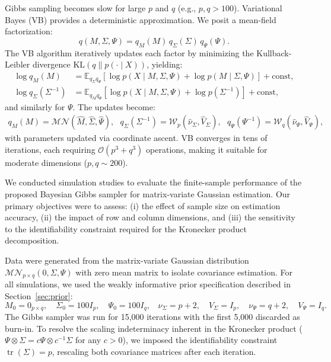 \documentclass[twoside]{article}
\begin{document}
\noindent Gibbs sampling becomes slow for large $p$ and $q$ (e.g., $p,q > 100$). Variational Bayes (VB) provides a deterministic approximation. We posit a mean-field factorization:
\begin{equation*}
q(M, \Sigma, \Psi) = q_M(M) \, q_\Sigma(\Sigma) \, q_\Psi(\Psi).
\end{equation*}
The VB algorithm iteratively updates each factor by minimizing the Kullback-Leibler divergence $\mathrm{KL}(q \| p(\cdot \mid X))$, yielding:
\begin{align*}
\log q_M(M) &= \mathbb{E}_{q_\Sigma q_\Psi}[\log p(X \mid M, \Sigma, \Psi) + \log p(M \mid \Sigma, \Psi)] + \text{const},\\
\log q_\Sigma(\Sigma^{-1}) &= \mathbb{E}_{q_M q_\Psi}[\log p(X \mid M, \Sigma, \Psi) + \log p(\Sigma^{-1})] + \text{const},
\end{align*}
and similarly for $\Psi$. The updates become:
\begin{eqnarray*}
q_M(M) = \mathcal{MN}(\widehat{M}, \widehat{\Sigma}, \widehat{\Psi}),\ \ \ 
q_\Sigma(\Sigma^{-1}) = \mathcal{W}_p(\widehat{\nu}_\Sigma, \widehat{V}_\Sigma),\ \ \ 
q_\Psi(\Psi^{-1}) = \mathcal{W}_q(\widehat{\nu}_\Psi, \widehat{V}_\Psi),
\end{eqnarray*}
with parameters updated via coordinate ascent. VB converges in tens of iterations, each requiring $\mathcal{O}(p^3 + q^3)$ operations, making it suitable for moderate dimensions ($p,q \sim 200$).

We conducted simulation studies to evaluate the finite-sample performance of the proposed Bayesian Gibbs sampler for matrix-variate Gaussian estimation. Our primary objectives were to assess: (i) the effect of sample size on estimation accuracy, (ii) the impact of row and column dimensions, and (iii) the sensitivity to the identifiability constraint required for the Kronecker product decomposition.

Data were generated from the matrix-variate Gaussian distribution $\mathcal{MN}_{p \times q}(0, \Sigma, \Psi)$ with zero mean matrix to isolate covariance estimation. For all simulations, we used the weakly informative prior specification described in Section~\ref{sec:prior}:
\begin{equation*}
M_0 = 0_{p \times q}, \quad \Sigma_0 = 100 I_p, \quad \Psi_0 = 100 I_q, \ \ \ \ \nu_\Sigma = p+2, \quad V_\Sigma = I_p, \quad \nu_\Psi = q+2, \quad V_\Psi = I_q.
\end{equation*}
The Gibbs sampler was run for 15,000 iterations with the first 5,000 discarded as burn-in. To resolve the scaling indeterminacy inherent in the Kronecker product ($\Psi \otimes \Sigma = c\Psi \otimes c^{-1}\Sigma$ for any $c>0$), we imposed the identifiability constraint $\operatorname{tr}(\Sigma) = p$, rescaling both covariance matrices after each iteration.
\end{document}
